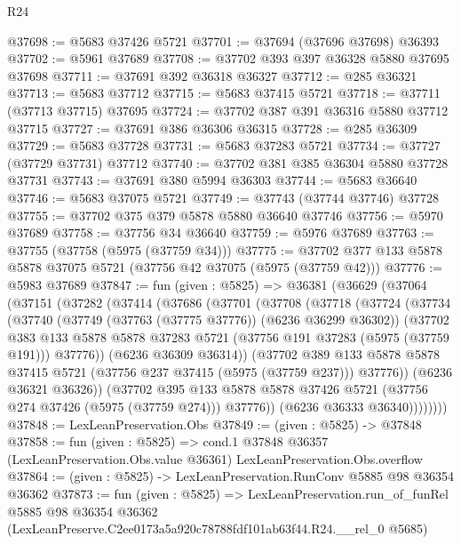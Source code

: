 \begin{lexlean}{R24}
\begin{coremodule}
@37698 := @5683 @37426 @5721
@37701 := @37694 (@37696 @37698) @36393
@37702 := @5961 @37689
@37708 := @37702 @393 @397 @36328 @5880 @37695 @37698
@37711 := @37691 @392 @36318 @36327
@37712 := @285 @36321
@37713 := @5683 @37712
@37715 := @5683 @37415 @5721
@37718 := @37711 (@37713 @37715) @37695
@37724 := @37702 @387 @391 @36316 @5880 @37712 @37715
@37727 := @37691 @386 @36306 @36315
@37728 := @285 @36309
@37729 := @5683 @37728
@37731 := @5683 @37283 @5721
@37734 := @37727 (@37729 @37731) @37712
@37740 := @37702 @381 @385 @36304 @5880 @37728 @37731
@37743 := @37691 @380 @5994 @36303
@37744 := @5683 @36640
@37746 := @5683 @37075 @5721
@37749 := @37743 (@37744 @37746) @37728
@37755 := @37702 @375 @379 @5878 @5880 @36640 @37746
@37756 := @5970 @37689
@37758 := @37756 @34 @36640
@37759 := @5976 @37689
@37763 := @37755 (@37758 (@5975 (@37759 @34)))
@37775 := @37702 @377 @133 @5878 @5878 @37075 @5721 (@37756 @42 @37075 (@5975 (@37759 @42)))
@37776 := @5983 @37689
@37847 := fun (given : @5825) =>
  @36381
    (@36629
      (@37064
        (@37151
          (@37282
            (@37414
              (@37686
                (@37701
                  (@37708
                    (@37718
                      (@37724
                        (@37734
                          (@37740
                            (@37749 (@37763 (@37775 @37776)) (@6236 @36299 @36302))
                            (@37702
                              @383
                              @133
                              @5878
                              @5878
                              @37283
                              @5721
                              (@37756 @191 @37283 (@5975 (@37759 @191)))
                              @37776))
                          (@6236 @36309 @36314))
                        (@37702
                          @389
                          @133
                          @5878
                          @5878
                          @37415
                          @5721
                          (@37756 @237 @37415 (@5975 (@37759 @237)))
                          @37776))
                      (@6236 @36321 @36326))
                    (@37702
                      @395
                      @133
                      @5878
                      @5878
                      @37426
                      @5721
                      (@37756 @274 @37426 (@5975 (@37759 @274)))
                      @37776))
                  (@6236 @36333 @36340))))))))
@37848 := LexLeanPreservation.Obs
@37849 := (given : @5825) -> @37848
@37858 := fun (given : @5825) =>
  cond.{1} @37848 @36357 (LexLeanPreservation.Obs.value @36361) LexLeanPreservation.Obs.overflow
@37864 := (given : @5825) -> LexLeanPreservation.RunConv @5885 @98 @36354 @36362
@37873 := fun (given : @5825) =>
  LexLeanPreservation.run_of_funRel
    @5885
    @98
    @36354
    @36362
    (LexLeanPreserve.C2ee0173a5a920c78788fdf101ab63f44.R24.__rel_0 @5685)
\end{coremodule}
\end{lexlean}
